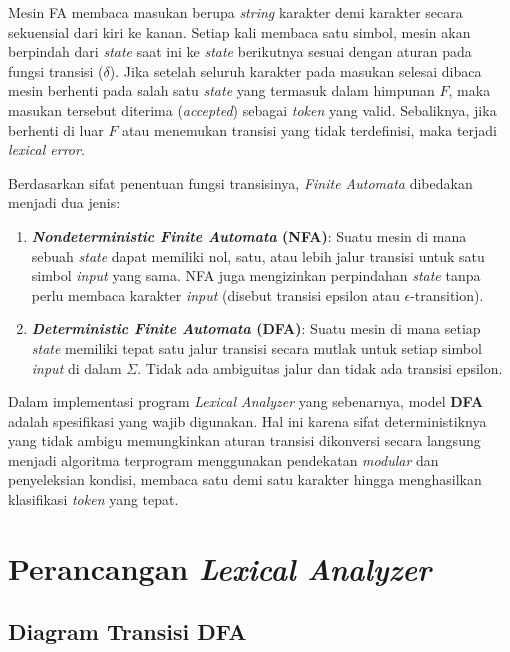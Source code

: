 \documentclass[12pt,a4paper]{article}
\begin{document}
Mesin FA membaca masukan berupa \textit{string} karakter demi karakter secara
sekuensial dari kiri ke kanan. Setiap kali membaca satu simbol,
mesin akan berpindah dari \textit{state} saat ini ke \textit{state} berikutnya
sesuai dengan aturan pada fungsi transisi ($\delta$). Jika setelah seluruh
karakter pada masukan selesai dibaca mesin berhenti pada salah satu
\textit{state} yang termasuk dalam himpunan $F$, maka masukan tersebut diterima
(\textit{accepted}) sebagai \textit{token} yang valid. Sebaliknya, jika berhenti
di luar $F$ atau menemukan transisi yang tidak terdefinisi, maka terjadi
\textit{lexical error}.

Berdasarkan sifat penentuan fungsi transisinya, \textit{Finite Automata} dibedakan menjadi dua jenis:
\begin{enumerate}
    \item \textbf{\textit{Nondeterministic Finite Automata} (NFA)}: Suatu mesin
        di mana sebuah \textit{state} dapat memiliki nol, satu, atau lebih jalur
        transisi untuk satu simbol \textit{input} yang sama. NFA juga
        mengizinkan perpindahan \textit{state} tanpa perlu membaca karakter
        \textit{input} (disebut transisi epsilon atau $\epsilon$-transition).
    \item \textbf{\textit{Deterministic Finite Automata} (DFA)}: Suatu mesin di
        mana setiap \textit{state} memiliki tepat satu jalur transisi secara
        mutlak untuk setiap simbol \textit{input} di dalam $\Sigma$. Tidak ada
        ambiguitas jalur dan tidak ada transisi epsilon.
\end{enumerate}

Dalam implementasi program \textit{Lexical Analyzer} yang sebenarnya, model
\textbf{DFA} adalah spesifikasi yang wajib digunakan. Hal ini karena sifat
deterministiknya yang tidak ambigu memungkinkan aturan transisi dikonversi
secara langsung menjadi algoritma terprogram menggunakan pendekatan
\textit{modular} dan penyeleksian kondisi, membaca satu demi satu karakter
hingga menghasilkan klasifikasi \textit{token} yang tepat.

\section{Perancangan \textit{Lexical Analyzer}}

\subsection{Diagram Transisi DFA}
\end{document}
